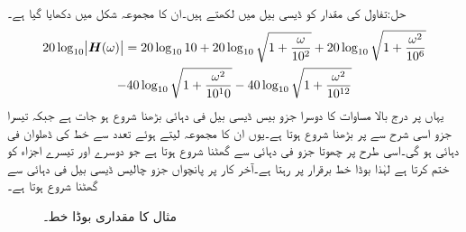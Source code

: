 حل:تفاول کی مقدار کو ڈیسی بیل میں لکھتے ہیں۔ان کا مجموعہ شکل  میں دکھایا گیا ہے۔
\begin{multline*}
20\log_{10}\abs{{{\boldsymbol{H}}}(\omega)}=20\log_{10} 10 +20\log_{10} \sqrt{1+\frac{\omega}{10^2}}+20\log_{10}\sqrt{1+\frac{\omega^2}{10^6}} \\
-40\log_{10}\sqrt{1+\frac{\omega^2}{10^10}}-40\log_{10}\sqrt{1+\frac{\omega^2}{10^{12}}}
\end{multline*}
یہاں  پر درج بالا مساوات کا دوسرا جزو بیس ڈیسی بیل فی دہائی بڑھنا شروع ہو جات ہے جبکہ تیسرا جزو اسی شرح سے  پر بڑھنا شروع ہوتا ہے۔یوں ان کا مجموعہ لیتے ہوئے  تعدد سے خط کی ڈھلوان  فی دہائی ہو گی۔اسی طرح  پر چھوتا جزو  فی دہائی سے گھٹنا شروع ہوتا ہے جو دوسرے اور تیسرے اجزاء کو ختم کرتا ہے لہٰذا بوڈا خط برقرار  پر رہتا ہے۔آخر کار  پر پانچواں جزو چالیس ڈیسی بیل فی دہائی سے گھٹنا شروع ہوتا ہے۔ 
\begin{figure}
\centering
{}
\caption{مثال  کا مقداری بوڈا خط۔}
\label{شکل_تعددی_چالیس_ڈیسی_بیل_ڈھلوان}
\end{figure}


